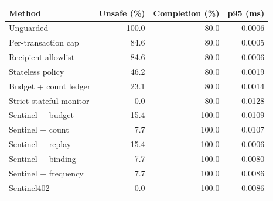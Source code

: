 \begin{tabular}{lrrr}
\hline
Method & Unsafe (\%) & Completion (\%) & p95 (ms) \\
\hline
Unguarded & 100.0 & 80.0 & 0.0006 \\
Per-transaction cap & 84.6 & 80.0 & 0.0005 \\
Recipient allowlist & 84.6 & 80.0 & 0.0006 \\
Stateless policy & 46.2 & 80.0 & 0.0019 \\
Budget + count ledger & 23.1 & 80.0 & 0.0014 \\
Strict stateful monitor & 0.0 & 80.0 & 0.0128 \\
Sentinel $-$ budget & 15.4 & 100.0 & 0.0109 \\
Sentinel $-$ count & 7.7 & 100.0 & 0.0107 \\
Sentinel $-$ replay & 15.4 & 100.0 & 0.0006 \\
Sentinel $-$ binding & 7.7 & 100.0 & 0.0080 \\
Sentinel $-$ frequency & 7.7 & 100.0 & 0.0086 \\
Sentinel402 & 0.0 & 100.0 & 0.0086 \\
\hline
\end{tabular}
